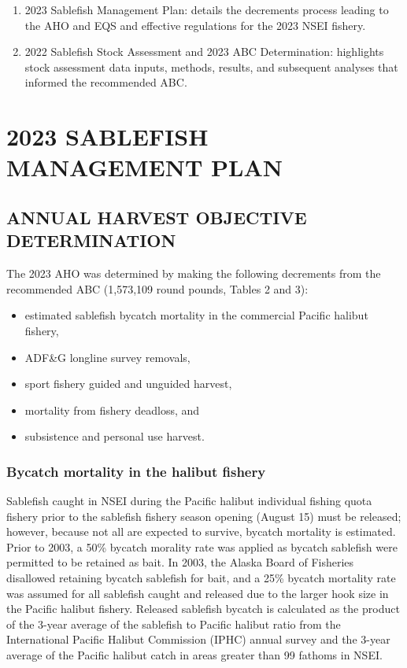 \documentclass[
]{article}
\providecommand{\tightlist}{%
  \setlength{\itemsep}{0pt}\setlength{\parskip}{0pt}}
\begin{document}
\begin{enumerate}
\def\labelenumi{\arabic{enumi}.}
\tightlist
\item
  2023 Sablefish Management Plan: details the decrements process leading to the AHO and EQS and effective regulations for the 2023 NSEI fishery.
\item
  2022 Sablefish Stock Assessment and 2023 ABC Determination: highlights stock assessment data inputs, methods, results, and subsequent analyses that informed the recommended ABC.
\end{enumerate}

\hypertarget{sablefish-management-plan}{%
\section{2023 SABLEFISH MANAGEMENT PLAN}\label{sablefish-management-plan}}

\hypertarget{annual-harvest-objective-determination}{%
\subsection{ANNUAL HARVEST OBJECTIVE DETERMINATION}\label{annual-harvest-objective-determination}}

The 2023 AHO was determined by making the following decrements from the recommended ABC (1,573,109 round pounds, Tables 2 and 3):

\begin{itemize}
\tightlist
\item
  estimated sablefish bycatch mortality in the commercial Pacific halibut fishery,
\item
  ADF\&G longline survey removals,
\item
  sport fishery guided and unguided harvest,
\item
  mortality from fishery deadloss, and
\item
  subsistence and personal use harvest.
\end{itemize}

\hypertarget{bycatch-mortality-in-the-halibut-fishery}{%
\subsubsection{Bycatch mortality in the halibut fishery}\label{bycatch-mortality-in-the-halibut-fishery}}

Sablefish caught in NSEI during the Pacific halibut individual fishing quota fishery prior to the sablefish fishery season opening (August 15) must be released; however, because not all are expected to survive, bycatch mortality is estimated. Prior to 2003, a 50\% bycatch morality rate was applied as bycatch sablefish were permitted to be retained as bait. In 2003, the Alaska Board of Fisheries disallowed retaining bycatch sablefish for bait, and a 25\% bycatch mortality rate was assumed for all sablefish caught and released due to the larger hook size in the Pacific halibut fishery. Released sablefish bycatch is calculated as the product of the 3-year average of the sablefish to Pacific halibut ratio from the International Pacific Halibut Commission (IPHC) annual survey and the 3-year average of the Pacific halibut catch in areas greater than 99 fathoms in NSEI.
\end{document}
